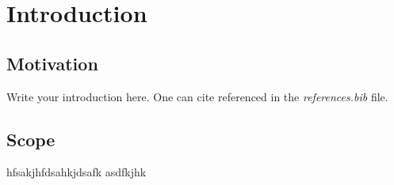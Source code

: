 \section{Introduction}
\subsection{Motivation}

Write your introduction here. One can cite\cite{ARXIVEXAMPLE} referenced in the \textit{references.bib} file.

\subsection{Scope}


hfsakjhfdsahkjdsafk
asdfkjhk